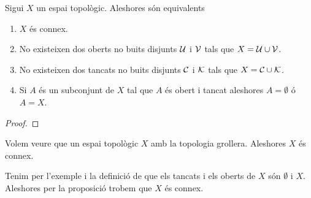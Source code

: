 \documentclass[../../Main.tex]{subfiles}
\begin{document}
	\begin{proposition}
		\label{prop:condicions equivalents a espai connex}
		Sigui \(X\) un espai topològic. Aleshores són equivalents
		\begin{enumerate}
			\item\label{prop:condicions equivalents a espai connex:eq1} \(X\) és connex.
			\item\label{prop:condicions equivalents a espai connex:eq2} No existeixen dos oberts no buits disjunts \(\mathcal{U}\) i \(\mathcal{V}\) tals que \(X=\mathcal{U}\cup\mathcal{V}\).
			\item\label{prop:condicions equivalents a espai connex:eq3} No existeixen dos tancats no buits disjunts \(\mathcal{C}\) i \(\mathcal{K}\) tals que \(X=\mathcal{C}\cup\mathcal{K}\).
			\item\label{prop:condicions equivalents a espai connex:eq4} Si \(A\) és un subconjunt de \(X\) tal que \(A\) és obert i tancat aleshores \(A=\emptyset\) ó \(A=X\).
		\end{enumerate}
		\begin{proof}
		\end{proof}
	\end{proposition}
	\begin{example}
		\label{ex:l'espai amb la topologia grollera és connex}
		Volem veure que un espai topològic \(X\) amb la topologia grollera. Aleshores \(X\) és connex.
		\begin{solution}
			Tenim per l'exemple  i la definició de  que els tancats i els oberts de \(X\) són \(\emptyset\) i \(X\). Aleshores per la proposició  trobem que \(X\) és connex.
		\end{solution}
	\end{example}
\end{document}
